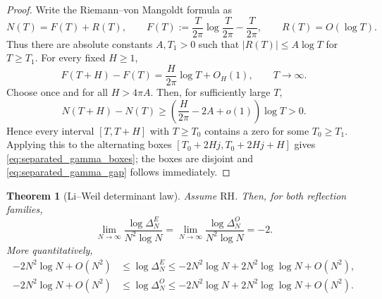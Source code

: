 \documentclass[11pt]{amsart}
\numberwithin{equation}{section}
\theoremstyle{plain}
\newtheorem{theorem}{Theorem}[section]
\theoremstyle{definition}
\theoremstyle{remark}
\newcommand{\RH}{\mathrm{RH}}
\begin{document}
\begin{proof}
Write the Riemann--von Mangoldt formula as
\begin{equation}
N(T)=F(T)+R(T),
\qquad
F(T):=\frac{T}{2\pi}\log\frac{T}{2\pi}-\frac{T}{2\pi},
\qquad
R(T)=O(\log T).
\label{eq:RVM_for_boxes}
\end{equation}
Thus there are absolute constants $A,T_1>0$ such that $|R(T)|\le A\log T$ for $T\ge T_1$. For every fixed $H\ge1$,
\begin{equation}
F(T+H)-F(T)=\frac{H}{2\pi}\log T+O_H(1),
\qquad T\to\infty.
\label{eq:RVM_short_fixed_interval}
\end{equation}
Choose once and for all $H>4\pi A$. Then, for sufficiently large $T$,
\[
N(T+H)-N(T)
\ge
\left(\frac{H}{2\pi}-2A+o(1)\right)\log T>0.
\]
Hence every interval $[T,T+H]$ with $T\ge T_0$ contains a zero for some $T_0\ge T_1$. Applying this to the alternating boxes $[T_0+2Hj,T_0+2Hj+H]$ gives \eqref{eq:separated_gamma_boxes}; the boxes are disjoint and \eqref{eq:separated_gamma_gap} follows immediately.
\end{proof}

\begin{theorem}[Li--Weil determinant law]
\label{thm:determinant_first_order}
Assume $\RH$. Then, for both reflection families,
\begin{equation}
\boxed{
\lim_{N\to\infty}
\frac{\log\Delta_N^E}{N^2\log N}
=
\lim_{N\to\infty}
\frac{\log\Delta_N^O}{N^2\log N}
=-2.}
\label{eq:determinant_first_order_limit}
\end{equation}
More quantitatively,
\begin{align}
-2N^2\log N+O(N^2)
&\le \log\Delta_N^E
\le -2N^2\log N+2N^2\log\log N+O(N^2),
\label{eq:E_determinant_two_sided}\\
-2N^2\log N+O(N^2)
&\le \log\Delta_N^O
\le -2N^2\log N+2N^2\log\log N+O(N^2).
\label{eq:O_determinant_two_sided}
\end{align}
\end{theorem}
\end{document}
